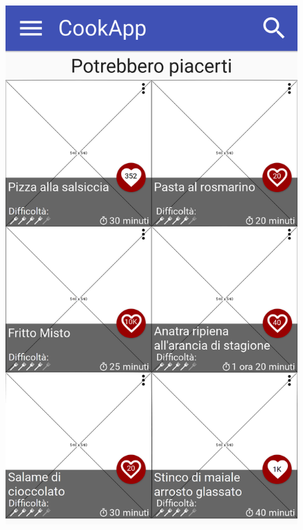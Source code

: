 \begin{figure}[H]
\begin{minipage}{.49\textwidth}
		\includegraphics[width=\textwidth]{img/wireframe/homepage.png}
	\end{minipage}
\end{figure}
